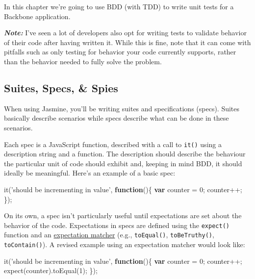 \documentclass[9pt]{book}
\newenvironment{Shaded}{}{}
\newcommand{\KeywordTok}[1]{\textcolor[rgb]{0.00,0.44,0.13}{\textbf{{#1}}}}
\newcommand{\DecValTok}[1]{\textcolor[rgb]{0.25,0.63,0.44}{{#1}}}
\newcommand{\StringTok}[1]{\textcolor[rgb]{0.25,0.44,0.63}{{#1}}}
\newcommand{\FunctionTok}[1]{\textcolor[rgb]{0.02,0.16,0.49}{{#1}}}
\newcommand{\NormalTok}[1]{{#1}}
\begin{document}
In this chapter we're going to use BDD (with TDD) to write unit tests
for a Backbone application.

\textbf{\emph{Note:}} I've seen a lot of developers also opt for writing
tests to validate behavior of their code after having written it. While
this is fine, note that it can come with pitfalls such as only testing
for behavior your code currently supports, rather than the behavior
needed to fully solve the problem.

\subsection{Suites, Specs, \& Spies}\label{suites-specs-spies}

When using Jasmine, you'll be writing suites and specifications (specs).
Suites basically describe scenarios while specs describe what can be
done in these scenarios.

Each spec is a JavaScript function, described with a call to
\texttt{it()} using a description string and a function. The description
should describe the behaviour the particular unit of code should exhibit
and, keeping in mind BDD, it should ideally be meaningful. Here's an
example of a basic spec:

\begin{Shaded}
\begin{Highlighting}[]
\FunctionTok{it}\NormalTok{(}\StringTok{'should be incrementing in value'}\NormalTok{, }\KeywordTok{function}\NormalTok{()\{}
    \KeywordTok{var} \NormalTok{counter = }\DecValTok{0}\NormalTok{;}
    \NormalTok{counter++;}
\NormalTok{\});}
\end{Highlighting}
\end{Shaded}

On its own, a spec isn't particularly useful until expectations are set
about the behavior of the code. Expectations in specs are defined using
the \texttt{expect()} function and an
\href{https://github.com/pivotal/jasmine/wiki/Matchers}{expectation
matcher} (e.g., \texttt{toEqual()}, \texttt{toBeTruthy()},
\texttt{toContain()}). A revised example using an expectation matcher
would look like:

\begin{Shaded}
\begin{Highlighting}[]
\FunctionTok{it}\NormalTok{(}\StringTok{'should be incrementing in value'}\NormalTok{, }\KeywordTok{function}\NormalTok{()\{}
    \KeywordTok{var} \NormalTok{counter = }\DecValTok{0}\NormalTok{;}
    \NormalTok{counter++;}
    \FunctionTok{expect}\NormalTok{(counter).}\FunctionTok{toEqual}\NormalTok{(}\DecValTok{1}\NormalTok{);}
\NormalTok{\});}
\end{Highlighting}
\end{Shaded}
\end{document}
